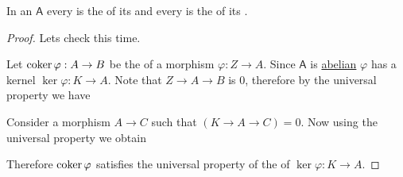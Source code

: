 \documentclass[../main.tex]{subfiles}
\begin{document}
\begin{lemma} \label{lemma:kernel-of-cokernel-abelian}
  In an  \(\mathsf{A}\) every  is the  of its  and every  is the  of its .
\end{lemma}
\begin{proof}
  Lets check  this time.

  Let \(\operatorname*{coker} \varphi: A \to B\) be the  of a morphism \(\varphi: Z \to A\).
  Since \(\mathsf{A}\) is \hyperref[def:abelian-category]{abelian} \(\varphi\) has a kernel \(\ker \varphi: K \to A\).
  Note that \(Z \to A \to B\) is 0, therefore by the  universal property we have
  \begin{center}
  \end{center}

  Consider a morphism \(A \to C\) such that \((K \to A \to C) = 0\).
  Now using the  universal property we obtain
  \begin{center}
  \end{center}
  Therefore \(\operatorname*{coker} \varphi\) satisfies the universal property of the  of \(\ker \varphi: K \to A\).
\end{proof}
\end{document}
